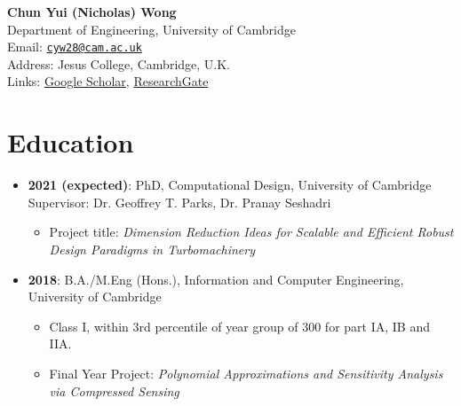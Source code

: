 \documentclass[letterpaper,11pt,oneside]{article}
\begin{document}
\noindent
\textbf{\Large{Chun Yui (Nicholas) Wong}}
\vspace{0.5cm}\\
\noindent
Department of Engineering, University of Cambridge\\
Email: \href{mailto:cyw28@cam.ac.uk}{\texttt{cyw28@cam.ac.uk}}\\
Address: Jesus College, Cambridge, U.K.\\
Links: \href{https://scholar.google.com/citations?user=uKp2t5EAAAAJ&hl=en}{Google Scholar}, \href{https://www.researchgate.net/profile/Chun_Yui_Wong}{ResearchGate}
\section*{Education}
\begin{itemize}
\item \textbf{2021 (expected)}: PhD, Computational Design, University of Cambridge\\
Supervisor: Dr. Geoffrey T. Parks, Dr. Pranay Seshadri
\begin{itemize}
\item Project title: \emph{Dimension Reduction Ideas for Scalable and Efficient Robust Design Paradigms in Turbomachinery}
\end{itemize}
\item \textbf{2018}: B.A./M.Eng (Hons.), Information and Computer Engineering, University of Cambridge
\begin{itemize}
\item Class I, within 3rd percentile of year group of 300 for part IA, IB and IIA.
\item Final Year Project: \emph{Polynomial Approximations and Sensitivity Analysis via Compressed Sensing}
\end{itemize}
\end{itemize}
\end{document}
